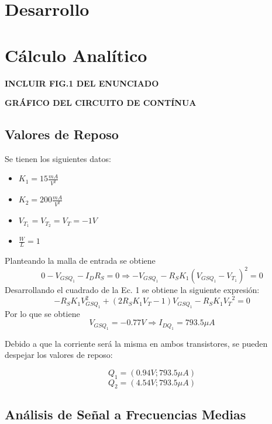 \documentclass[a4paper, 10pt, spanish]{article}
\begin{document}
\section{Desarrollo}

\section{Cálculo Analítico}
\textbf{INCLUIR FIG.1 DEL ENUNCIADO}

\textbf{GRÁFICO DEL CIRCUITO DE CONTÍNUA}

\subsection{Valores de Reposo}
  Se tienen los siguientes datos:
  \begin{itemize}
    \item $K_1=15\frac{mA}{V^2}$
    \item $K_2=200\frac{mA}{V^2}$
    \item $V_{T_1}=V_{T_2}=V_{T}=-1V$
    \item $\frac{W}{L}=1$
  \end{itemize}

  Planteando la malla de entrada se obtiene
  \begin{equation}
    0 - V_{GSQ_1} - I_D R_S = 0 \Rightarrow -V_{GSQ_1} - R_S K_1 (V_{GSQ_1}-V_{T_1})^2 = 0
  \end{equation}
  Desarrollando el cuadrado de la Ec. 1 se obtiene la siguiente expresión:
  \begin{equation}
    -R_S K_1 V_{GSQ_1}^2  + (2R_S K_1 V_T - 1) V_{GSQ_1} - R_S K_1 {V_{T}}^2 = 0
  \end{equation}
  Por lo que se obtiene
  \begin{equation}
     V_{GSQ_1}=-0.77V \Rightarrow I_{DQ_1}=793.5 \mu A
  \end{equation}

  Debido a que la corriente será la misma en ambos transistores, se pueden despejar los valores de reposo:

  \begin{equation}
    Q_1=(0.94V;793.5\mu A)
  \end{equation}
  \begin{equation}
    Q_2=(4.54V;793.5\mu A)
  \end{equation}

\subsection{Análisis de Señal a Frecuencias Medias}
\end{document}
